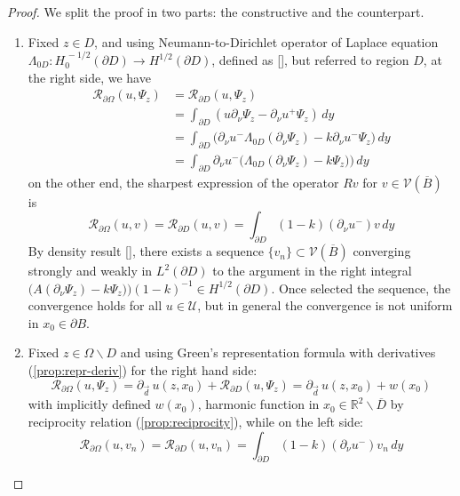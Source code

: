 \documentclass[10pt, a4paper, twoside, openright]{book}
\theoremstyle{definition}
\theoremstyle{plain}
\theoremstyle{plain}
\theoremstyle{plain}
\theoremstyle{plain}
\theoremstyle{plain}
\theoremstyle{plain}
\theoremstyle{plain}
\theoremstyle{plain}
\begin{document}
\begin{proof}
We split the proof in two parts: the constructive and the counterpart.
 \begin{enumerate}
  \item Fixed $z \in D$, and using Neumann-to-Dirichlet operator of Laplace equation $\Lambda_{0D}:H^{\,-1/2}_0(\partial D)\to H^{1/2}(\partial D)$, defined as \ref{}, but referred to region $D$, 
    at the right side, we have
    \begin{align}
    \mathcal{R}_{\partial \Omega}(u,\Psi_z) &= \mathcal{R}_{\partial D}(u,\Psi_z) \\
    &= \int_{\partial D}(u\partial_\nu\Psi_z - \partial_\nu u^+ \Psi_z) \,dy\\
    &= \int_{\partial D}\bigl(\partial_\nu u^- \Lambda_{0D}(\partial_\nu\Psi_z) - k \partial_\nu u^- \Psi_z\bigr) \,dy \\
    &= \int_{\partial D}\partial_\nu u^-\Big( \Lambda_{0D}(\partial_\nu\Psi_z) - k \Psi_z)\Big) \,dy
    \end{align}
  on the other end, the sharpest expression of the operator $Rv$ for $v\in\mathcal{V}(\overline{B})$ is
  \begin{equation}
   \mathcal{R}_{\partial \Omega}(u,v) = \mathcal{R}_{\partial D}(u,v) = \int_{\partial D}(1-k)(\partial_\nu u^- )v\,dy
  \end{equation}
  By density result \ref{}, there exists a sequence $\{v_n\}\subset \mathcal{V}(\overline{B})$ converging strongly and weakly in $L^2(\partial D)$ to the argument in the right integral $\bigl( A(\partial_\nu\Psi_z) - k \Psi_z)\bigr)(1-k)^{-1}\in H^{1/2}(\partial D)$.
  Once selected the sequence, the convergence holds for all $u\in\mathcal{U}$, but in general the convergence is not uniform in $x_0\in \partial B$.
  \item Fixed $z \in \Omega\backslash D$ and using Green's representation formula with derivatives (\ref{prop:repr-deriv}) for the right hand side:
  \begin{equation}
   \mathcal{R}_{\partial \Omega}(u,\Psi_z) = \partial_{\vec{d}}\,u(z,x_0) + \mathcal{R}_{\partial D}(u,\Psi_z) = \partial_{\vec{d}}\,u(z,x_0) + w(x_0)
  \end{equation}
  with implicitly defined $w(x_0)$, harmonic function in $x_0 \in \mathbb{R}^2\backslash \overline{D}$ by reciprocity relation (\ref{prop:reciprocity}), while on the left side:
  \begin{equation}
   \mathcal{R}_{\partial \Omega}(u,v_n) = \mathcal{R}_{\partial D}(u,v_n) = \int_{\partial D}(1-k)(\partial_\nu u^- )v_n\,dy

\end{equation}
\end{enumerate}
\end{proof}
\end{document}
